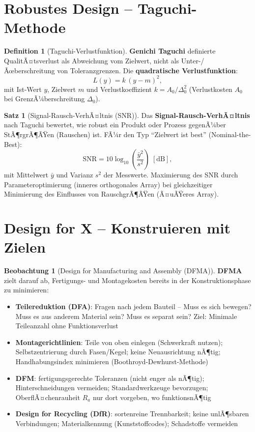 ﻿\documentclass[a4paper,12pt]{report}
\theoremstyle{definition}
\newtheorem{definition}{Definition}
\newtheorem{satz}{Satz}
\newtheorem{beobachtung}{Beobachtung}
\begin{document}
\section{Robustes Design -- Taguchi-Methode}

\begin{definition}[Taguchi-Verlustfunktion]
\textbf{Genichi Taguchi} definierte QualitÃ¤tsverlust als Abweichung vom Zielwert,
nicht als Unter-/Ãœberschreitung von Toleranzgrenzen.
Die \textbf{quadratische Verlustfunktion}:
\[
  L(y) = k\,(y - m)^2,
\]
mit Ist-Wert $y$, Zielwert $m$ und Verlustkoeffizient $k = A_0/\Delta_0^2$
(Verlustkosten $A_0$ bei GrenzÃ¼berschreitung $\Delta_0$).
\end{definition}

\begin{satz}[Signal-Rausch-VerhÃ¤ltnis (SNR)]
Das \textbf{Signal-Rausch-VerhÃ¤ltnis} nach Taguchi bewertet, wie robust
ein Produkt oder Prozess gegenÃ¼ber StÃ¶rgrÃ¶ÃŸen (Rauschen) ist.
FÃ¼r den Typ ``Zielwert ist best'' (Nominal-the-Best):
\[
  \mathrm{SNR} = 10\log_{10}\left(\frac{\bar{y}^2}{s^2}\right)\;[\mathrm{dB}],
\]
mit Mittelwert $\bar{y}$ und Varianz $s^2$ der Messwerte.
Maximierung des SNR durch Parameteroptimierung (inneres orthogonales Array)
bei gleichzeitiger Minimierung des Einflusses von RauschgrÃ¶ÃŸen (Ã¤uÃŸeres Array).
\end{satz}

\section{Design for X -- Konstruieren mit Zielen}

\begin{beobachtung}[Design for Manufacturing and Assembly (DFMA)]
\textbf{DFMA} zielt darauf ab, Fertigungs- und Montagekosten bereits
in der Konstruktionsphase zu minimieren:
\begin{itemize}
    \item[-] \textbf{Teilereduktion (DFA)}: Fragen nach jedem Bauteil --
          Muss es sich bewegen? Muss es aus anderem Material sein? Muss es separat sein?
          Ziel: Minimale Teileanzahl ohne Funktionsverlust
    \item[-] \textbf{Montagerichtlinien}: Teile von oben einlegen (Schwerkraft nutzen);
          Selbstzentrierung durch Fasen/Kegel; keine Neuausrichtung nÃ¶tig;
          Handhabungsindex minimieren (Boothroyd-Dewhurst-Methode)
    \item[-] \textbf{DFM}: fertigungsgerechte Toleranzen (nicht enger als nÃ¶tig);
          Hinterschneidungen vermeiden; Standardwerkzeuge bevorzugen;
          OberflÃ¤chenrauheit $R_a$ nur dort vorgeben, wo funktionsnÃ¶tig
    \item[-] \textbf{Design for Recycling (DfR)}: sortenreine Trennbarkeit;
          keine unlÃ¶sbaren Verbindungen; Materialkennung (Kunststoffcodes);
          Schadstoffe vermeiden
\end{itemize}
\end{beobachtung}
\end{document}
